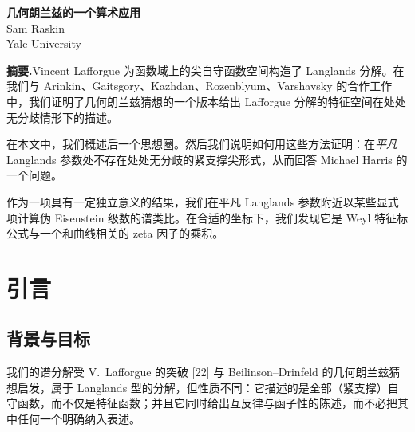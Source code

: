 \begin{center}
  {\LARGE\bfseries 几何朗兰兹的一个算术应用}\\[6pt]
  {\large Sam Raskin}\\[2pt]
  {\normalsize Yale University}
\end{center}

\vspace{0.6em}
\begin{center}
\begin{minipage}{0.92\textwidth}
\small
\noindent\textbf{摘要.}\quad Vincent Lafforgue 为函数域上的尖自守函数空间构造了 Langlands 分解。在我们与 Arinkin、Gaitsgory、Kazhdan、Rozenblyum、Varshavsky 的合作工作中，我们证明了几何朗兰兹猜想的一个版本给出 Lafforgue 分解的特征空间在处处无分歧情形下的描述。

在本文中，我们概述后一个思想圈。然后我们说明如何用这些方法证明：在\emph{平凡} Langlands 参数处不存在处处无分歧的紧支撑尖形式，从而回答 Michael Harris 的一个问题。

作为一项具有一定独立意义的结果，我们在平凡 Langlands 参数附近以某些显式项计算伪 Eisenstein 级数的谱类比。在合适的坐标下，我们发现它是 Weyl 特征标公式与一个和曲线相关的 zeta 因子的乘积。
\end{minipage}
\end{center}

\vspace{0.8em}

\section{引言}

\subsection{背景与目标}


我们的谱分解受 V.~Lafforgue 的突破 [22] 与 Beilinson--Drinfeld 的几何朗兰兹猜想启发，属于 Langlands 型的分解，但性质不同：它描述的是全部（紧支撑）自守函数，而不仅是特征函数；并且它同时给出互反律与函子性的陈述，而不必把其中任何一个明确纳入表述。

